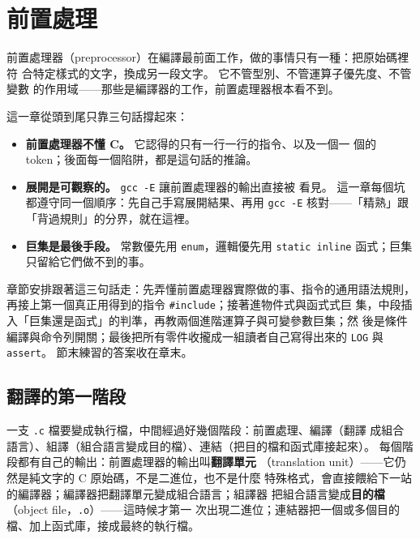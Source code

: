 \chapter{前置處理}
\label{ch:preprocessing}

前置處理器（preprocessor）在編譯最前面工作，做的事情只有一種：把原始碼裡符
合特定樣式的文字，換成另一段文字。 它不管型別、不管運算子優先度、不管變數
的作用域——那些是編譯器的工作，前置處理器根本看不到。

這一章從頭到尾只靠三句話撐起來：

\begin{itemize}
\item \textbf{前置處理器不懂 C。} 它認得的只有一行一行的指令、以及一個一
個的 token；後面每一個陷阱，都是這句話的推論。
\item \textbf{展開是可觀察的。} \texttt{gcc -E} 讓前置處理器的輸出直接被
看見。 這一章每個坑都遵守同一個順序：先自己手寫展開結果、再用
\texttt{gcc -E} 核對——「精熟」跟「背過規則」的分界，就在這裡。
\item \textbf{巨集是最後手段。} 常數優先用 \texttt{enum}，邏輯優先用
\texttt{static inline} 函式；巨集只留給它們做不到的事。
\end{itemize}

章節安排跟著這三句話走：先弄懂前置處理器實際做的事、指令的通用語法規則，
再接上第一個真正用得到的指令 \texttt{\#include}；接著進物件式與函式式巨
集，中段插入「巨集還是函式」的判準，再教兩個進階運算子與可變參數巨集；然
後是條件編譯與命令列開關；最後把所有零件收攏成一組讀者自己寫得出來的
\texttt{LOG} 與 \texttt{assert}。 節末練習的答案收在章末。

\section{翻譯的第一階段}
\label{sec:pp-what}

一支 \texttt{.c} 檔要變成執行檔，中間經過好幾個階段：前置處理、編譯（翻譯
成組合語言）、組譯（組合語言變成目的檔）、連結（把目的檔和函式庫接起來）。
每個階段都有自己的輸出：前置處理器的輸出叫\textbf{翻譯單元}
（translation unit）——它仍然是純文字的 C 原始碼，不是二進位，也不是什麼
特殊格式，會直接餵給下一站的編譯器；編譯器把翻譯單元變成組合語言；組譯器
把組合語言變成\textbf{目的檔}（object file，\texttt{.o}）——這時候才第一
次出現二進位；連結器把一個或多個目的檔、加上函式庫，接成最終的執行檔。

